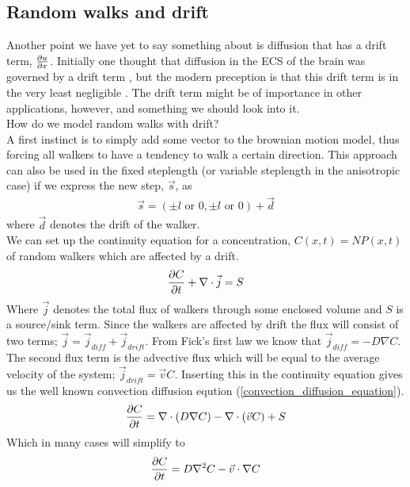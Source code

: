 \subsection{Random walks and drift}\label{random_walks_and_drift}

Another point we have yet to say something about is diffusion that has a drift term, $\frac{\partial u}{\partial x}$. 
Initially one thought that diffusion in the ECS of the brain was governed by a drift term , but the modern preception is that this drift term is in the very least negligible \cite{nicholson2001diffusion}.
The drift term might be of importance in other applications, however, and something we should look into it.\\
How do we model random walks with drift? \\
A first instinct is to simply add some vector to the brownian motion model, thus forcing all walkers to have a tendency to walk a certain direction. 
This approach can also be used in the fixed steplength (or variable steplength in the anisotropic case)  if we express the new step, $\vec{s}$, as
\begin{align*}
 \vec{s} = (\pm l \text{ or }0,\pm l \text{ or }0) +\vec{d}
\end{align*}
where $\vec{d}$ denotes the drift of the walker.\\
We can set up the continuity equation for a concentration, $C(x,t) = NP(x,t)$ of random walkers which are affected by a drift.
\begin{equation}
 \frac{\partial C}{\partial t} +\nabla\cdot\vec{j} = S
\end{equation}
Where $\vec{j}$ denotes the total flux of walkers through some enclosed volume and $S$ is a source/sink term. 
Since the walkers are affected by drift the flux will consist of two terms; $\vec{j} = \vec{j}_{diff}+\vec{j}_{drift}$. 
From Fick's first law we know that $\vec{j}_{diff} = -D\nabla C$. 
The second flux term is the advective flux which will be equal to the average velocity of the system; $\vec{j}_{drift} = \vec{v}C$. 
Inserting this in the continuity equation gives us the well known convection diffusion eqution (\ref{convection_diffusion_equation}).
\begin{equation}\label{convection_diffusion_equation}
 \frac{\partial C}{\partial t} = \nabla\cdot\left(D\nabla C\right)-\nabla\cdot\left(\vec{v}C\right) + S
\end{equation}
Which in many cases will simplify to
\begin{equation}
 \frac{\partial C}{\partial t} = D\nabla^2 C-\vec{v}\cdot\nabla C
\end{equation}

